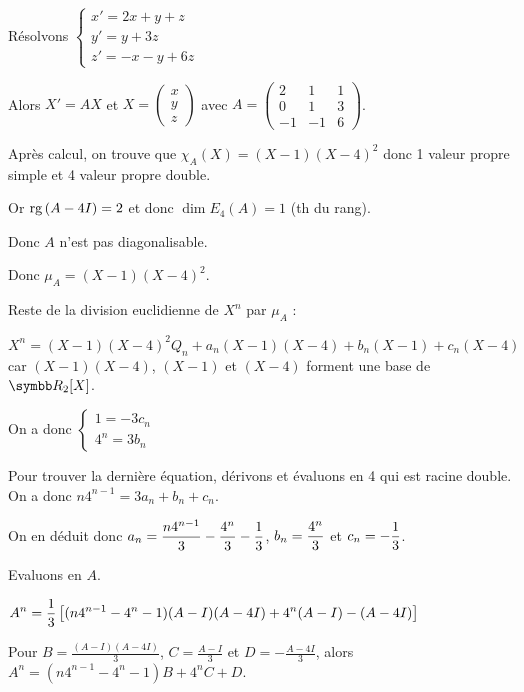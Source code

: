 \begin{exemple}
    Résolvons $\begin{cases}
        x' = 2x +y + z \\
        y' = y + 3z \\
        z' = -x - y + 6z
    \end{cases}$

    Alors $X' = AX$ et $X = \begin{pmatrix}
    x \\ y \\ z
    \end{pmatrix}$ avec $A = \begin{pmatrix}
    2 & 1 & 1 \\
    0 & 1 & 3 \\
    -1 & -1 & 6
    \end{pmatrix}$.

    Après calcul, on trouve que $\chi_A(X) = (X - 1)(X - 4)^2$ donc 1 valeur propre 
    simple et 4 valeur propre double. 

    Or $\operatorname{rg} \, (A - 4I) = 2$ et donc $\dim E_4(A) = 1$ (th du rang). 

    Donc $A$ n'est pas diagonalisable. 

    Donc $\mu_A = (X - 1)(X - 4)^2$.

    Reste de la division euclidienne de $X^n$ par $\mu_A$ : 

    $X^n = (X - 1)(X - 4)^2 Q_n + a_n(X - 1)(X - 4) + b_n(X - 1) + c_n(X - 4)$
    car $(X - 1)(X - 4)$, $(X - 1)$ et $(X - 4)$ forment une base de $\R_{2}[X]$.

    On a donc  $\begin{cases}
        1 = -3c_n \\
        4^n = 3 b_n
    \end{cases}$

    Pour trouver la dernière équation, dérivons et évaluons en 4 qui est racine double.
    On a donc $n 4^{n - 1} = 3 a_n + b_n + c_n$.

    On en déduit donc $\displaystyle a_n = \frac{n 4^{n - 1}}{3} - \frac{4^n}{3} - \frac 1 3$, 
    $\displaystyle b_n = \frac{4^n}{3}$ et $\displaystyle c_n = -\frac 1 3$.

    Evaluons en $A$. 

    $\displaystyle A^n = \frac 1 3 \left[ (n 4^{n - 1} - 4^n - 1)(A - I)(A - 4I) + 4^n (A - I) - (A - 4I) \right]$

    Pour $B = \frac{(A - I)(A - 4I)}{3}$, $C = \frac{A - I} 3$ et $D = -\frac{A - 4I}{3}$, alors
    $A^n = (n 4^{n - 1} - 4^n - 1) B + 4^n C + D$.


\end{exemple}
